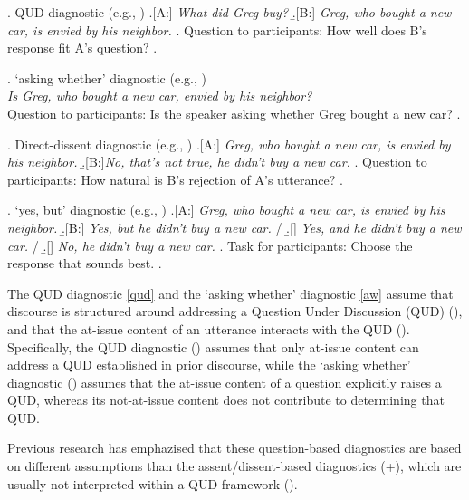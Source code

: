 \documentclass[times,linguex,xcolor]{glossa}
\begin{document}
  \ex. \label{qud}%
    QUD diagnostic (e.g., \citealt{tonhauser_diagnosing_2012,chen_presuppositions_2024})
    \a.[A:] \emph{What did Greg buy?}
    \b.[B:] \emph{Greg, who bought a new car, is envied by his neighbor.}
    \z.
    Question to participants: How well does B's response fit A's question?
  \z.

  \ex. \label{aw}%
    `asking whether' diagnostic (e.g., \citealt{tonhauser_how_2018,solstad_cataphoric_2024})\smallskip\\
      \emph{Is Greg, who bought a new car, envied by his neighbor?}\smallskip
  \\ Question to participants: Is the speaker asking whether Greg bought a new car?
  \z.

  \ex. \label{dd} Direct-dissent diagnostic (e.g., \citealt{tonhauser_diagnosing_2012,syrett_experimental_2015})
    \a.[A:] \emph{Greg, who bought a new car, is envied by his neighbor.}
    \b.[B:]\emph{No, that's not true, he didn't buy a new car.}
    \z.
  Question to participants: How natural is B's rejection of A's utterance?
  \z.

  \ex. \label{yesbut}%
    `yes, but' diagnostic (e.g., \citealt{xue_correlation_2011,destruel_cross-linguistic_2015})
    \a.[A:] \emph{Greg, who bought a new car, is envied by his neighbor.}
    \b.[B:] \emph{Yes, but he didn't buy a new car.} /
    \b.[] \emph{Yes, and he didn't buy a new car.} /
    \b.[] \emph{No, he didn't buy a new car.}
    \z.
    Task for participants: Choose the response that sounds best.
  \z.

  The QUD diagnostic \ref{qud} and the `asking whether' diagnostic \ref{aw} assume that discourse is structured around addressing a Question Under Discussion (QUD) (\citealt{roberts_information_1996,ginzburg_interrogatives_1996}), and that the at-issue content of an utterance interacts with the QUD (\citealt{amaral_review_2007,simons_what_2010}). Specifically, the QUD diagnostic (\citealt{tonhauser_diagnosing_2012,chen_presuppositions_2024}) assumes that only at-issue content can address a QUD established in prior discourse, while the `asking whether' diagnostic (\citealt{tonhauser_how_2018,solstad_cataphoric_2024}) assumes that the at-issue content of a question explicitly raises a QUD, whereas its not-at-issue content does not contribute to determining that QUD.

  Previous research has emphazised that these question-based diagnostics are based on different assumptions than the assent/dissent-based diagnostics (+), which are usually not interpreted within a QUD-framework (\citealt{snider_at-issueness_2017,snider_anaphoric_2017,snider_distinguishing_2018,koev_notions_2018,faller_discourse_2019,korotkova_evidential_2020}).
\end{document}
